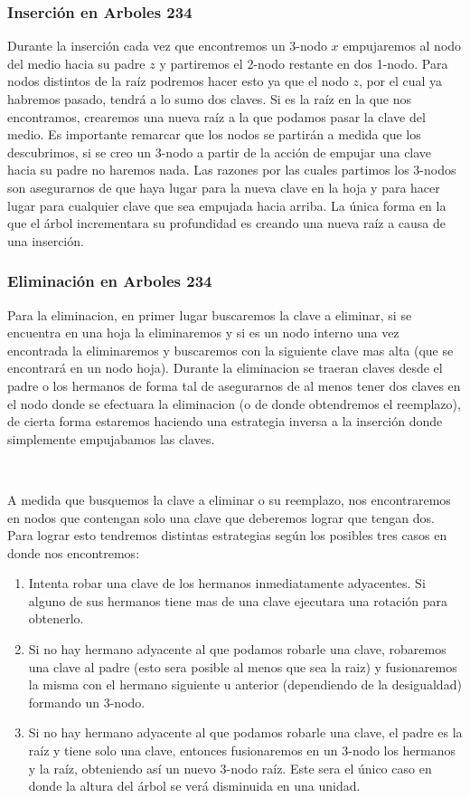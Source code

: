 \subsubsection{Inserci\'on en Arboles 234}

Durante la inserci\'on cada vez que encontremos un 3-nodo $x$ empujaremos al nodo del medio hacia su padre $z$ y partiremos el 2-nodo restante en dos 1-nodo. Para nodos distintos de la ra\'iz podremos hacer esto ya que el nodo $z$, por el cual ya habremos pasado, tendr\'a a lo sumo dos claves.  Si es la ra\'iz en la que nos encontramos, crearemos una nueva ra\'iz a la que podamos pasar la clave del medio. Es importante remarcar que los nodos se partir\'an a medida que los descubrimos, si se creo un 3-nodo a partir de la acci\'on de empujar una clave hacia su padre no haremos nada. Las razones por las cuales partimos los 3-nodos son asegurarnos de que haya lugar para la nueva clave en la hoja y para hacer lugar para cualquier clave que sea empujada hacia arriba. La \'unica forma en la que el \'arbol incrementara su profundidad es creando una nueva ra\'iz a causa de una inserci\'on.

\subsubsection{Eliminaci\'on en Arboles 234}

Para la eliminacion, en primer lugar buscaremos la clave a eliminar, si se encuentra en una hoja la eliminaremos y si es un nodo interno una vez encontrada la eliminaremos y buscaremos con la siguiente clave mas alta (que se encontrar\'a en un nodo hoja). Durante la eliminacion se traeran claves desde el padre o los hermanos de forma tal de asegurarnos de al menos tener dos claves en el nodo donde se efectuara la eliminacion (o de donde obtendremos el reemplazo), de cierta forma estaremos haciendo una estrategia inversa a la inserci\'on donde simplemente empujabamos las claves.

~

A medida que busquemos la clave a eliminar o su reemplazo, nos encontraremos en nodos que contengan solo una clave que deberemos lograr que tengan dos. Para lograr esto tendremos distintas estrategias seg\'un los posibles tres casos en donde nos encontremos:

\begin{enumerate}
 \item Intenta robar una clave de los hermanos inmediatamente adyacentes. Si alguno de sus hermanos tiene mas de una clave ejecutara una rotaci\'on para obtenerlo.
 \item Si no hay hermano adyacente al que podamos robarle una clave, robaremos una clave al padre (esto sera posible al menos que sea la raiz) y fusionaremos la misma con el hermano siguiente u anterior (dependiendo de la desigualdad) formando un 3-nodo.
 \item Si no hay hermano adyacente al que podamos robarle una clave, el padre es la ra\'iz y tiene solo una clave, entonces fusionaremos en un 3-nodo los hermanos y la ra\'iz, obteniendo as\'i un nuevo 3-nodo ra\'iz. Este sera el \'unico caso en donde la altura del \'arbol se ver\'a disminuida en una unidad.
\end{enumerate}

